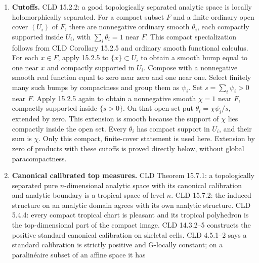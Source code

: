 \documentclass[
  11pt,
]{article}
\begin{document}
\begin{enumerate}
  operations (CLD 3.3.12). CLD Proposition 3.4.4 states: for a
  G-tropical chart \(f:X\to V\), a coefficient form \(\eta\) has zero
  pullback in the G-form sheaf if and only if its restriction to
  \(f(W)\) is zero for every compact domain \(W\) of \(X\). Proposition
  3.4.1 is the compact-chart presheaf version. We use actual compact
  images to prove the tripod one-form identity. Its moment and
  coefficients are ordinary, so its equality in the containing G-sheaf
  is an equality of ordinary forms.
\item
  \textbf{Cutoffs.} CLD 15.2.2: a good topologically separated analytic
  space is locally holomorphically separated. For a compact subset \(F\) and a finite ordinary open cover
  \((U_i)\) of \(F\), there are nonnegative ordinary smooth
  \(\theta_i\), each compactly supported inside \(U_i\), with
  \(\sum_i\theta_i=1\) near \(F\). This compact specialization follows
  from CLD Corollary 15.2.5 and ordinary smooth functional calculus.
  For each \(x\in F\), apply 15.2.5 to \(\{x\}\subset U_i\) to obtain a
  smooth bump equal to one near \(x\) and compactly supported in
  \(U_i\). Compose with a nonnegative smooth real function equal to
  zero near zero and one near one. Select finitely many such bumps by
  compactness and group them as \(\psi_i\). Set \(s=\sum_i\psi_i>0\)
  near \(F\). Apply 15.2.5 again to obtain a nonnegative smooth
  \(\chi=1\) near \(F\), compactly supported inside \(\{s>0\}\).
  On that open set put \(\theta_i=\chi\psi_i/s\), extended by zero.
  This extension is smooth because the support of \(\chi\) lies
  compactly inside the open set. Every \(\theta_i\) has compact support
  in \(U_i\), and their sum is \(\chi\). Only this compact, finite-cover
  statement is used here. Extension by zero of products with these cutoffs is proved
  directly below, without global paracompactness.
\item
  \textbf{Canonical calibrated top measures.} CLD Theorem 15.7.1: a
  topologically separated pure \(n\)-dimensional analytic space with its
  canonical calibration and analytic boundary is a tropical space of
  level \(n\). CLD 15.7.2: the induced structure on an analytic domain
  agrees with its own analytic structure. CLD 5.4.4: every compact
  tropical chart is pleasant and its tropical polyhedron is the
  top-dimensional part of the compact image. CLD 14.3.2--5 constructs
  the positive standard canonical calibration on skeletal cells. CLD
  4.5.1--2 says a standard calibration is strictly positive and
  G-locally constant; on a paralinéaire subset of an affine space it has

\end{enumerate}
\end{document}
